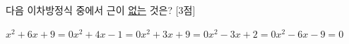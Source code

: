 다음 이차방정식 중에서 근이 \underline{없는} 것은? \mbox{[3점]}
\begin{choicesii}{$x^2+6x+9=0$}{$x^2+4x-1=0$}{$x^2+3x+9=0$}{$x^2-3x+2=0$}{$x^2-6x-9=0$}\end{choicesii}
